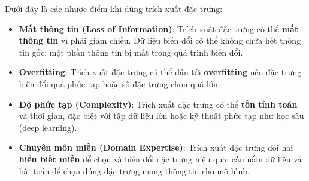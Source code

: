 \begin{tinhchat}[title={Nhược điểm}]
Dưới đây là các nhược điểm khi dùng trích xuất đặc trưng:
\begin{itemize}
  \item \textbf{Mất thông tin (Loss of Information)}: Trích xuất đặc trưng có thể \textbf{mất thông tin} vì phải giảm chiều. Dữ liệu biến đổi có thể không chứa hết thông tin gốc; một phần thông tin bị mất trong quá trình biến đổi.
  \item \textbf{Overfitting}: Trích xuất đặc trưng có thể dẫn tới \textbf{overfitting} nếu đặc trưng biến đổi quá phức tạp hoặc số đặc trưng chọn quá lớn.
  \item \textbf{Độ phức tạp (Complexity)}: Trích xuất đặc trưng có thể \textbf{tốn tính toán} và thời gian, đặc biệt với tập dữ liệu lớn hoặc kỹ thuật phức tạp như học sâu (deep learning).
  \item \textbf{Chuyên môn miền (Domain Expertise)}: Trích xuất đặc trưng đòi hỏi \textbf{hiểu biết miền} để chọn và biến đổi đặc trưng hiệu quả; cần nắm dữ liệu và bài toán để chọn đúng đặc trưng mang thông tin cho mô hình.
\end{itemize}
\end{tinhchat}
